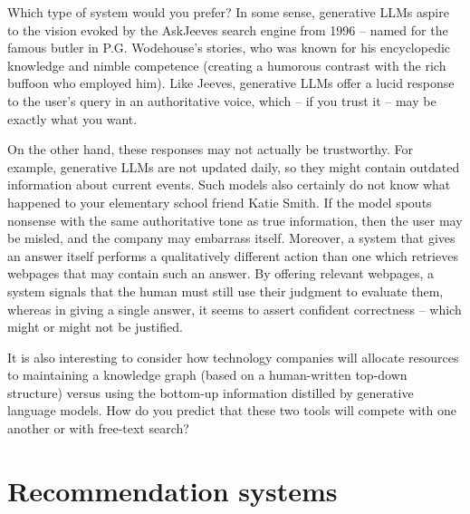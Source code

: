 Which type of system would you prefer?   In some sense, generative LLMs aspire to the vision evoked by the AskJeeves search engine from 1996 -- named for the famous butler in P.G. Wodehouse's stories, who was known for his encyclopedic knowledge and nimble competence (creating a humorous contrast with the rich buffoon who employed him).  Like Jeeves, generative LLMs offer a lucid response to the user's query in an authoritative voice, which -- if you trust it -- may be exactly what you want.

On the other hand, these responses may not actually be trustworthy.  For example, generative LLMs are not updated daily, so they might contain outdated information about current events.  Such models also certainly do not know what happened to your elementary school friend Katie Smith.  If the model spouts nonsense with the same authoritative tone as true information, then the user may be misled, and the company may embarrass itself.  Moreover, a system that gives an answer itself performs a qualitatively different action than one which retrieves webpages that may contain such an answer.  By offering relevant webpages, a system signals that the human must still use their judgment to evaluate them, whereas  in giving a single answer, it seems to assert confident correctness -- which might or might not be justified.

It is also interesting to consider how technology companies will allocate resources to maintaining a knowledge graph (based on a human-written top-down structure) versus using the bottom-up information distilled by generative language models.  How do you predict that these two tools will compete with one another or with free-text search?



\section{Recommendation systems}


